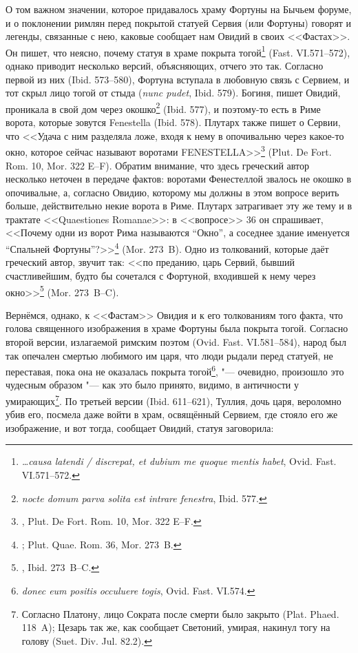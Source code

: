 О том важном значении, которое придавалось храму Фортуны на Бычьем форуме, и о поклонении римлян перед покрытой статуей Сервия (или Фортуны) говорят и легенды, связанные с нею, каковые сообщает нам Овидий в своих <<Фастах>>. Он пишет, что неясно, почему статуя в храме покрыта тогой\footnote{\textit{\ldots{}causa latendi / discrepat, et dubium me quoque mentis habet}, Ovid. Fast. VI.571--572.} (Fast. VI.571--572), однако приводит несколько версий, объясняющих, отчего это так. Согласно первой из них (Ibid. 573--580), Фортуна вступала в любовную связь с Сервием, и тот скрыл лицо тогой от стыда (\textit{nunc pudet}, Ibid. 579). Богиня, пишет Овидий, проникала в свой дом через окошко\footnote{\textit{nocte domum parva solita est intrare fenestra}, Ibid. 577.} (Ibid. 577), и поэтому-то есть в Риме ворота, которые зовутся Fenestella (Ibid. 578). Плутарх также пишет о Сервии, что <<Удача с ним разделяла ложе, входя к нему в опочивальню через какое-то окно, которое сейчас называют воротами FENESTELLA>>\footnote{, Plut. De Fort. Rom. 10, Mor. 322 E--F.} (Plut. De Fort. Rom. 10, Mor. 322 E--F). Обратим внимание, что здесь греческий автор несколько неточен в передаче фактов: воротами Фенестеллой звалось не окошко в опочивальне, а, согласно Овидию, которому мы должны в этом вопросе верить больше, действительно некие ворота в Риме. Плутарх затрагивает эту же тему и в трактате <<Quaestiones Romanae>>: в <<вопросе>> 36 он спрашивает, <<Почему одни из ворот Рима называются ``Окно'', а соседнее здание именуется ``Спальней Фортуны''?>>\footnote{; Plut. Quae. Rom. 36, Mor. 273~B.} (Mor. 273~B). Одно из толкований, которые даёт греческий автор, звучит так: <<по преданию, царь Сервий, бывший счастливейшим, будто бы сочетался с Фортуной, входившей к нему через окно>>\footnote{, Ibid. 273~B--C.} (Mor. 273~B--C).

Вернёмся, однако, к <<Фастам>> Овидия и к его толкованиям того факта, что голова священного изображения в храме Фортуны была покрыта тогой. Согласно второй версии, излагаемой римским поэтом (Ovid. Fast. VI.581--584), народ был так опечален смертью любимого им царя, что люди рыдали перед статуей, не переставая, пока она не оказалась покрыта тогой\footnote{\textit{donec eum positis occuluere togis}, Ovid. Fast. VI.574.}, "--- очевидно, произошло это чудесным образом "--- как это было принято, видимо, в античности у умирающих\footnote{Согласно Платону, лицо Сократа после смерти было закрыто (Plat. Phaed. 118~A); Цезарь так же, как сообщает Светоний, умирая, накинул тогу на голову (Suet. Div. Jul. 82.2).}. По третьей версии (Ibid. 611--621), Туллия, дочь царя, вероломно убив его, посмела даже войти в храм, освящённый Сервием, где стояло его же изображение, и вот тогда, сообщает Овидий, статуя заговорила:

